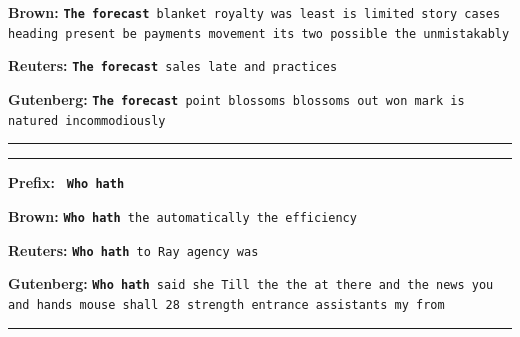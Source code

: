 \documentclass[11pt,a4paper]{article}
\begin{document}
\textbf{Brown:}  \texttt{\textbf{The forecast} blanket royalty was least is limited story cases heading present be payments movement its two possible the unmistakably}
\vspace{1mm}

\textbf{Reuters:}    \texttt{\textbf{The forecast} sales late and practices}
\vspace{1mm}

\textbf{Gutenberg:} \texttt{\textbf{The forecast} point blossoms blossoms out won mark is natured incommodiously}

\rule{0.49\textwidth}{0.4pt}

\rule{0.49\textwidth}{0.4pt}
\label{hath_ex_unigram}
\textbf{Prefix:} \texttt{ \textbf{Who hath} }
\vspace{1mm}

\textbf{Brown:} \texttt{\textbf{Who hath} the automatically the efficiency}
\vspace{1mm}


\textbf{Reuters:}   \texttt{\textbf{Who hath} to Ray agency was}
\vspace{1mm}

\textbf{Gutenberg:} \texttt{\textbf{Who hath} said she Till the the at there and the news you and hands mouse shall 28 strength entrance assistants my from}

\rule{0.49\textwidth}{0.4pt}
\end{document}
